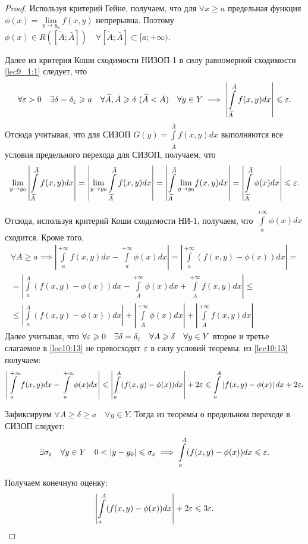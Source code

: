 \documentclass[../../main.tex]{subfiles}
\begin{document}
\begin{proof}
Используя критерий Гейне, получаем, что для $\forall x \ge a$ предельная функция ${\phi(x) = \underset{y \to y_0}{\lim}f(x,y)}$ непрерывна. Поэтому 
$\phi(x) \in R([\widetilde{A};\bar{A}])\quad \forall [\widetilde{A};\bar{A}] 
\subset [a;+\infty) $.

Далее из критерия Коши сходимости НИЗОП-1 в силу равномерной сходимости 
\eqref{lec9_1:1} следует, что \[\forall \varepsilon > 0\quad \exists \delta = 
\delta_\varepsilon 
\geqslant a\quad \forall \widetilde{A},\bar {A} \geqslant \delta \ (\widetilde{A} < 
\bar{A}) \quad
\forall y 
\in Y \implies \left| \int\limits_{\widetilde{A}}^{\bar{A}}f(x,y)dx \right| 
\leqslant 
\varepsilon. \]
Отсюда учитывая, что для СИЗОП 
$G(y)=\int\limits_{\widetilde{A}}^{\bar{A}}f(x,y)dx$ выполняются все условия 
предельного перехода для СИЗОП,
получаем, что \[\underset{y \to y_0}\lim  \left| 
\int\limits_{\widetilde{A}}^{\bar{A}}f(x,y)dx  \right| = \left| \underset{y 
\to 
y_0}\lim \int\limits_{\widetilde{A}}^{\bar{A}}f(x,y)dx  \right| = \left| 
\int\limits_{\widetilde{A}}^{\bar{A}}  \underset{y \to y_0}\lim f(x,y)dx  
\right| 
= \left| \int\limits_{\widetilde{A}}^{\bar{A}}\phi(x)dx \right| \leqslant \varepsilon 
.\]

Отсюда, используя критерий Коши сходимости НИ-1, получаем, что 
$\int\limits_a^{+\infty}\phi(x)dx$ сходится.
Кроме того, \begin{equation}
\begin{gathered}
\label{lec10:13}  \forall A \ge a \implies 
\left|\int\limits_{a}^{+\infty}f(x,y)dx  
-\int\limits_{a}^{+\infty}\phi(x)dx \right| = 
\left|\int\limits_{a}^{+\infty}(f(x,y) - \phi(x))dx \right| = \\ =
\left|\int\limits_{a}^{A}(f(x,y) - \phi(x))dx - 
\int\limits_{A}^{+\infty}\phi(x)dx + 
\int\limits_{A}^{+\infty}f(x,y)dx\right| \le\\\le \left| 
\int\limits_{a}^{A}(f(x,y) 
- \phi(x))dx \right| + \left|\int\limits_{A}^{+\infty}\phi(x)dx \right| 
+ \left| \int\limits_{A}^{+\infty}f(x,y)dx\right|
\end{gathered}
\end{equation}
Далее учитывая, что $\forall \varepsilon \geqslant 0 \quad \exists \delta = \delta_\varepsilon 
\quad \forall 
A \geqslant \delta \quad \forall y \in Y  $ второе и третье слагаемое в 
\eqref{lec10:13}
не превосходят $\varepsilon$ в силу условий теоремы,
из \eqref{lec10:13} получаем: \[ \left| \int\limits_{a}^{+\infty}f(x,y)dx - 
\int\limits_{a}^{+\infty}\phi(x)dx\right| \leqslant \left| 
\int\limits_{a}^{A}(f(x,y) - \phi(x))dx \right| + 2\varepsilon \leqslant 
\int\limits_{a}^{A}\left| f(x,y) - \phi(x)\right|dx + 2\varepsilon  .\]

Зафиксируем $\forall A \ge \delta \ge a \quad \forall y \in Y$. Тогда из 
теоремы о предельном переходе в СИЗОП следует: \[ \exists \sigma_\varepsilon \quad 
\forall y 
\in Y \quad 0 < \left|y - y_0 \right| \leqslant \sigma_\varepsilon \implies 
\int\limits_{a}^{A}(f(x,y) - \phi(x))dx \leqslant \varepsilon .\]

Получаем конечную оценку: \[\left| \int\limits_{a}^{A}(f(x,y) - \phi(x))dx 
\right| + 2\varepsilon \leqslant 3\varepsilon. \qedhere\]
\end{proof}
\end{document}
